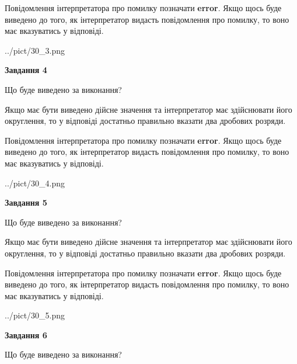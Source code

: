 \documentclass[12pt, ukrainian]{article}
\begin{document}
{\begin {Large}
Повідомлення інтерпретатора про помилку позначати \textbf{error}.
Якщо щось буде виведено до того, як інтерпретатор видасть повідомлення про помилку, 
то воно має вказуватись у відповіді. \par

\begin{center}
	{../pict/30_3.png}
\end{center}
\newpage

{\begin {center}\textbf{Завдання 4}\end {center}}\par
Що буде виведено за виконання? \par

Якщо має бути виведено дійсне значення та інтерпретатор має здійснювати його округлення, 
то у відповіді достатньо правильно вказати два дробових розряди.

Повідомлення інтерпретатора про помилку позначати \textbf{error}.
Якщо щось буде виведено до того, як інтерпретатор видасть повідомлення про помилку, 
то воно має вказуватись у відповіді. \par

\begin{center}
	{../pict/30_4.png}
\end{center}
\newpage

{\begin {center}\textbf{Завдання 5}\end {center}}\par
Що буде виведено за виконання? \par

Якщо має бути виведено дійсне значення та інтерпретатор має здійснювати його округлення, 
то у відповіді достатньо правильно вказати два дробових розряди.

Повідомлення інтерпретатора про помилку позначати \textbf{error}.
Якщо щось буде виведено до того, як інтерпретатор видасть повідомлення про помилку, 
то воно має вказуватись у відповіді. \par

\begin{center}
	{../pict/30_5.png}
\end{center}
\newpage

{\begin {center}\textbf{Завдання 6}\end {center}}\par
Що буде виведено за виконання? \par


\end{Large}}
\end{document}
